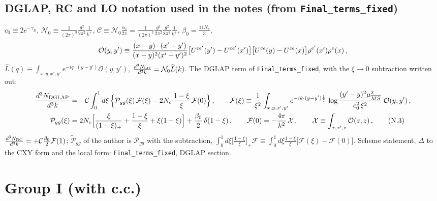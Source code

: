\documentclass[9pt]{article}
\numberwithin{equation}{section}
\begin{document}
{\color{red}
\subsection*{DGLAP, RC and LO notation used in the notes (from \texttt{Final\_terms\_fixed})}
 $c_{0}\equiv2e^{-\gamma_{E}}$, $\mathcal{N}_{0}\equiv\frac{1}{(2\pi)^{3}}\frac{g^{2}}{2\pi^{2}}\frac{1}{k^{+}}$, $\mathcal{C}\equiv\mathcal{N}_{0}\frac{\alpha_{s}}{2\pi}=\frac{1}{(2\pi)^{3}}\frac{g^{2}}{2\pi^{2}}\frac{g^{2}}{8\pi^{2}}\frac{1}{k^{+}}$, $\beta_{0}=\frac{11N_{c}}{3}$, \begin{align}\mathcal{O}(y,y')\equiv\frac{(x-y)\cdot(x'-y')}{(x-y)^{2}(x'-y')^{2}}\big[U^{ce'}(y')-U^{ce'}(x')\big]\big[U^{ce}(y)-U^{ce}(x)\big]\rho^{e'}(x')\rho^{e}(x)\,,\notag\end{align}$\widehat{L}(q)\equiv\int_{x,y,x',y'}e^{-iq\cdot(y-y')}\mathcal{O}(y,y')$, $\frac{d^{3}N_{\rm LO}}{d^{3}k}=\mathcal{N}_{0}\widehat{L}(k)$. The DGLAP term of \texttt{Final\_terms\_fixed}, with the $\xi\to0$ subtraction written out:
\begin{align}
\frac{d^{3}N_{\rm DGLAP}}{d^{3}k}&=-\mathcal{C}\int_{0}^{1}d\xi\,\Big\{\mathcal{P}_{gg}(\xi)\,\mathcal{F}(\xi)-2N_{c}\,\frac{1-\xi}{\xi}\,\mathcal{F}(0)\Big\}\,,\qquad
\mathcal{F}(\xi)\equiv\frac{1}{\xi^{2}}\int_{x,y,x',y'}e^{-ik\cdot(y-y')\frac{1}{\xi}}\,\log\frac{(y'-y)^{2}\mu^{2}_{\overline{MS}}}{c_{0}^{2}\,\xi^{2}}\;\mathcal{O}(y,y')\,,\notag\\
\mathcal{P}_{gg}(\xi)&=2N_{c}\Big[\frac{\xi}{(1-\xi)_{+}}+\frac{1-\xi}{\xi}+\xi(1-\xi)\Big]+\frac{\beta_{0}}{2}\,\delta(1-\xi)\,,\qquad
\mathcal{F}(0)=-\frac{4\pi}{k^{2}}\,\mathcal{X}\,,\qquad\mathcal{X}\equiv\int_{x,x',z}\mathcal{O}(z,z)\,,\tag{N.3}\label{eq:fx-DGLAP}
\end{align}
$\frac{d^{3}N_{\rm RC}}{d^{3}k}=+\mathcal{C}\frac{\beta_{0}}{2}\mathcal{F}(1)$; $\widetilde{\mathcal{P}}_{gg}$ of the author is $\mathcal{P}_{gg}$ with the subtraction, $\int_{0}^{1}d\xi\big[\frac{1-\xi}{\xi}\big]_{+}\mathcal{F}\equiv\int_{0}^{1}d\xi\frac{1-\xi}{\xi}\big[\mathcal{F}(\xi)-\mathcal{F}(0)\big]$. Scheme statement, $\Delta$ to the CXY form and the local form: \texttt{Final\_terms\_fixed}, DGLAP section.}\par

\section{Group I (with c.c.)}
\end{document}
